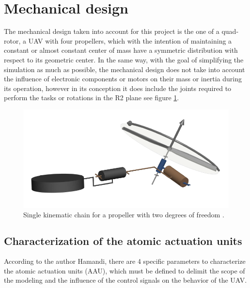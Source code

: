 \documentclass[a4paper, 12pt, oneside]{book}
\begin{document}
\section{Mechanical design}\label{mech_des}
The mechanical design taken into account for this project is the one of a quad-rotor, a UAV with four propellers, which with the intention of maintaining a constant or almost constant center of mass have a symmetric distribution with respect to its geometric center. In the same way, with the goal of simplifying the simulation as much as possible, the mechanical design does not take into account the influence of electronic components or motors on their mass or inertia during its operation, however in its conception it does include the joints required to perform the tasks or rotations in the R2 plane see figure \ref{fig:joint_r2}.

\begin{figure}[H]
    \begin{center}
        \includegraphics[width=.5\linewidth]{figures/joint_r2.PNG}
        \caption{Single kinematic chain for a propeller with two degrees of freedom \cite{hamandi2020survey}.}
        \label{fig:joint_r2}
    \end{center}
\end{figure}

\subsection{Characterization of the atomic actuation units}
According to the author Hamandi, there are 4 specific parameters to characterize the atomic actuation units (AAU), which must be defined to delimit the scope of the modeling and the influence of the control signals on the behavior of the UAV.
\end{document}
